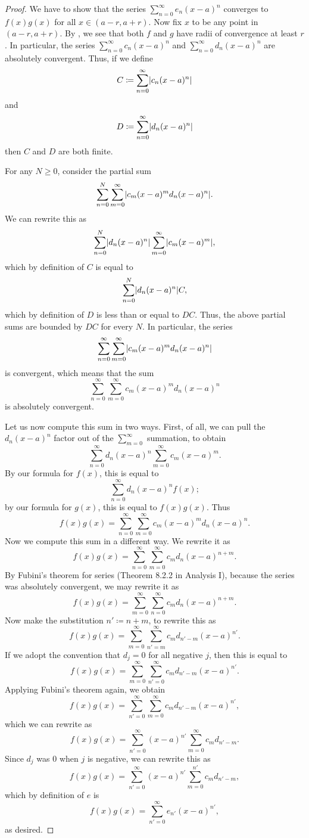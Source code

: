 \begin{proof}
  We have to show that the series \(\sum_{n = 0}^\infty e_n (x - a)^n\) converges to \(f(x) g(x)\) for all \(x \in (a - r, a + r)\).
  Now fix \(x\) to be any point in \((a - r, a + r)\).
  By , we see that both \(f\) and \(g\) have radii of convergence at least \(r\).
  In particular, the series \(\sum_{n = 0}^\infty c_n (x - a)^n\) and \(\sum_{n = 0}^\infty d_n (x - a)^n\) are absolutely convergent.
  Thus, if we define
  \[
    C \coloneqq \sum_{n = 0}^\infty \abs{c_n (x - a)^n}
  \]
  and
  \[
    D \coloneqq \sum_{n = 0}^\infty \abs{d_n (x - a)^n}
  \]
  then \(C\) and \(D\) are both finite.

  For any \(N \geq 0\), consider the partial sum
  \[
    \sum_{n = 0}^N \sum_{m = 0}^\infty \abs{c_m (x - a)^m d_n (x - a)^n}.
  \]
  We can rewrite this as
  \[
    \sum_{n = 0}^N \abs{d_n (x - a)^n} \sum_{m = 0}^\infty \abs{c_m (x - a)^m},
  \]
  which by definition of \(C\) is equal to
  \[
    \sum_{n = 0}^N \abs{d_n (x - a)^n} C,
  \]
  which by definition of \(D\) is less than or equal to \(DC\).
  Thus, the above partial sums are bounded by \(DC\) for every \(N\).
  In particular, the series
  \[
    \sum_{n = 0}^\infty \sum_{m = 0}^\infty \abs{c_m (x - a)^m d_n (x - a)^n}
  \]
  is convergent, which means that the sum
  \[
    \sum_{n = 0}^\infty \sum_{m = 0}^\infty c_m (x - a)^m d_n (x - a)^n
  \]
  is absolutely convergent.

  Let us now compute this sum in two ways.
  First, of all, we can pull the \(d_n (x - a)^n\) factor out of the \(\sum_{m = 0}^\infty\) summation, to obtain
  \[
    \sum_{n = 0}^\infty d_n (x - a)^n \sum_{m = 0}^\infty c_m (x - a)^m.
  \]
  By our formula for \(f(x)\), this is equal to
  \[
    \sum_{n = 0}^\infty d_n (x - a)^n f(x);
  \]
  by our formula for \(g(x)\), this is equal to \(f(x) g(x)\).
  Thus
  \[
    f(x) g(x) = \sum_{n = 0}^\infty \sum_{m = 0}^\infty c_m (x - a)^m d_n (x - a)^n.
  \]
  Now we compute this sum in a different way.
  We rewrite it as
  \[
    f(x) g(x) = \sum_{n = 0}^\infty \sum_{m = 0}^\infty c_m d_n (x - a)^{n + m}.
  \]
  By Fubini's theorem for series (Theorem 8.2.2 in Analysis I), because the series was absolutely convergent, we may rewrite it as
  \[
    f(x) g(x) = \sum_{m = 0}^\infty \sum_{n = 0}^\infty c_m d_n (x - a)^{n + m}.
  \]
  Now make the substitution \(n' \coloneqq n + m\), to rewrite this as
  \[
    f(x) g(x) = \sum_{m = 0}^\infty \sum_{n' = m}^\infty c_m d_{n' - m} (x - a)^{n'}.
  \]
  If we adopt the convention that \(d_j = 0\) for all negative \(j\), then this is equal to
  \[
    f(x) g(x) = \sum_{m = 0}^\infty \sum_{n' = 0}^\infty c_m d_{n' - m} (x - a)^{n'}.
  \]
  Applying Fubini's theorem again, we obtain
  \[
    f(x) g(x) = \sum_{n' = 0}^\infty \sum_{m = 0}^\infty c_m d_{n' - m} (x - a)^{n'},
  \]
  which we can rewrite as
  \[
    f(x) g(x) = \sum_{n' = 0}^\infty (x - a)^{n'} \sum_{m = 0}^\infty c_m d_{n' - m}.
  \]
  Since \(d_j\) was \(0\) when \(j\) is negative, we can rewrite this as
  \[
    f(x) g(x) = \sum_{n' = 0}^\infty (x - a)^{n'} \sum_{m = 0}^{n'} c_m d_{n' - m},
  \]
  which by definition of \(e\) is
  \[
    f(x) g(x) = \sum_{n' = 0}^\infty e_{n'} (x - a)^{n'},
  \]
  as desired.
\end{proof}

